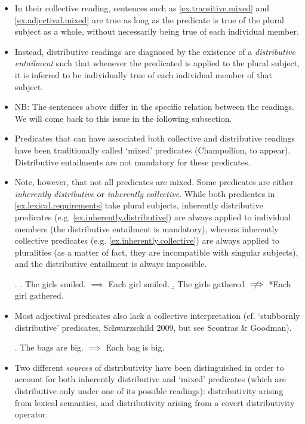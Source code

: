 \documentclass[a4paper]{article}
\begin{document}
\begin{itemize}
\item In their collective reading, sentences such as \ref{ex.transitive.mixed} and \ref{ex.adjectival.mixed} are true as long as the predicate is true of the plural subject as a whole, without necessarily being true of each individual member.  

\item Instead, distributive readings are diagnosed by the existence of a \emph{distributive entailment} such that whenever the predicated is applied to the plural subject, it is inferred to be individually true of each individual member of that subject. 

\item NB: The sentences above differ in the specific relation between the readings. We will come back to this issue in the following subsection. 

\item Predicates that can have associated both collective and distributive readings have been traditionally called `mixed' predicates (Champollion, to appear). Distributive entailments are not mandatory for these predicates. 

\item Note, however, that not all predicates are mixed. Some predicates are either \emph{inherently distributive} or \emph{inherently collective}. While both predicates in \ref{ex.lexical.requirements} take plural subjects, inherently distributive predicates (e.g. \ref{ex.inherently.distributive}) are always applied to individual members (the distributive entailment is mandatory), whereas inherently collective predicates (e.g. \ref{ex.inherently.collective}) are always applied to pluralities (as a matter of fact, they are incompatible with singular subjects), and the distributive entailment is always impossible. 

\ex. \label{ex.lexical.requirements}
\a. The girls smiled. \label{ex.inherently.distributive}
$\implies$ Each girl smiled. 
\b. The girls gathered \label{ex.inherently.collective}
$\centernot\implies$ *Each girl gathered. 

\item Most adjectival predicates also lack a collective interpretation (cf. `stubbornly distributive' predicates, Schwarzschild 2009, but see Scontras \& Goodman). 

\ex. The bags are big. $\implies$ Each bag is big. 

\item Two different \emph{sources} of distributivity have been distinguished in order to account for both inherently distributive and `mixed' predicates (which are distributive only under one of its possible readings): distributivity arising from lexical semantics, and distributivity arising from a covert distributivity operator. 


\end{itemize}
\end{document}
